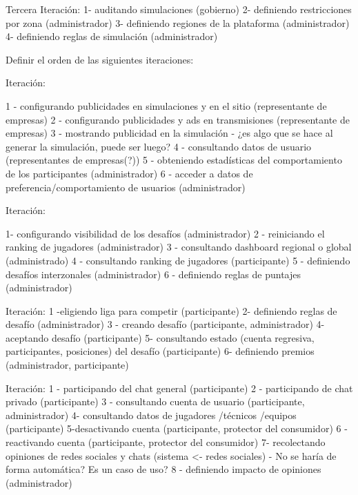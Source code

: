 Tercera Iteración:
1- auditando simulaciones (gobierno)
2- definiendo restricciones por zona (administrador)
3- definiendo regiones de la plataforma (administrador)
4- definiendo reglas de simulación (administrador)

Definir el orden de las siguientes iteraciones:


Iteración: 

1 - configurando publicidades en simulaciones y en el sitio (representante de empresas)
2 - configurando publicidades y ads en transmisiones (representante de empresas)
3 - mostrando publicidad en la simulación - ¿es algo que se hace al generar la simulación,  puede ser luego?
4 -  consultando datos de usuario (representantes de empresas(?))
5 -  obteniendo estadísticas del comportamiento de los participantes (administrador)
6  -  acceder a datos de preferencia/comportamiento de usuarios (administrador)





Iteración:

1- configurando visibilidad de los desafíos (administrador)
2 - reiniciando el ranking de jugadores (administrador)
3 -  consultando dashboard regional o global (administrado)
4 - consultando ranking de jugadores (participante)
5 - definiendo desafíos interzonales (administrador)
6 -  definiendo reglas de puntajes (administrador)




Iteración:
1 -eligiendo liga para competir (participante)
2- definiendo reglas de desafío (administrador)
3 - creando desafío (participante, administrador)
4-aceptando desafío (participante)
5-  consultando estado (cuenta regresiva, participantes, posiciones) del desafío (participante)
6- definiendo premios (administrador, participante) 


Iteración:
1 - participando del chat general (participante)
2 - participando de chat privado (participante)
3 -  consultando cuenta de usuario (participante, administrador)
4- consultando datos de jugadores /técnicos /equipos (participante)
5-desactivando cuenta (participante, protector del consumidor)
6 - reactivando cuenta (participante, protector del consumidor)
7-  recolectando opiniones de redes sociales y chats (sistema <- redes sociales) - No se haría de forma automática? Es un caso de uso? 
8 - definiendo impacto de opiniones (administrador)